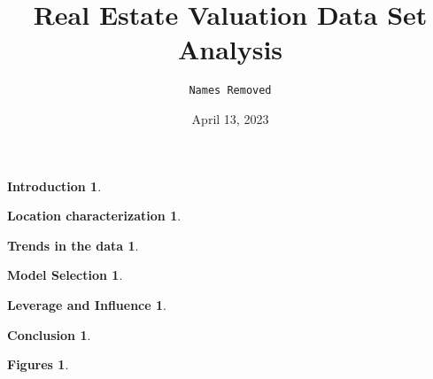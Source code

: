 \documentclass[hidelinks]{article}
\date{April 13, 2023}
\author{\texttt{Names Removed}}
\title{%
Real Estate Valuation Data Set Analysis }
\theoremstyle{break}
\renewcommand{\section}[2]{\theoremstyle{break} \newtheorem*{thm#1}{#1}\begin{thm#1}#2\end{thm#1}}
\begin{document}
\maketitle
\newpage
\section{Introduction}{}
\section{Location characterization}{}
\section{Trends in the data}{}
\section{Model Selection}{}
\newpage
\section{Leverage and Influence}{}
\section{Conclusion}{}
\newpage
\section{Figures}{}
\end{document}
